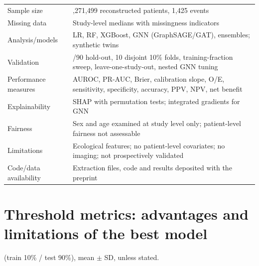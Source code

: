 \documentclass[journal]{IEEEtran}
\begin{document}
{\begin{longtable}[]{@{}
  >{\raggedright\arraybackslash}p{}
  >{\raggedright\arraybackslash}p{}@{}}
Sample size & 3,271,499 reconstructed patients, 1,425 events \\
Missing data & Study-level medians with missingness indicators \\
Analysis/models & LR, RF, XGBoost, GNN (GraphSAGE/GAT), ensembles;
synthetic twins \\
Validation & 10/90 hold-out, 10 disjoint 10\% folds, training-fraction
sweep, leave-one-study-out, nested GNN tuning \\
Performance measures & AUROC, PR-AUC, Brier, calibration slope, O/E,
sensitivity, specificity, accuracy, PPV, NPV, net benefit \\
Explainability & SHAP with permutation tests; integrated gradients for
GNN \\
Fairness & Sex and age examined at study level only; patient-level
fairness not assessable \\
Limitations & Ecological features; no patient-level covariates; no
imaging; not prospectively validated \\
Code/data availability & Extraction files, code and results deposited
with the preprint \\
\end{longtable}
}

\section{Threshold metrics: advantages and limitations of the best
model}\label{threshold-metrics-advantages-and-limitations-of-the-best-model}

(train 10\% / test 90\%), mean \ensuremath{\pm} SD, unless stated.
\end{document}
